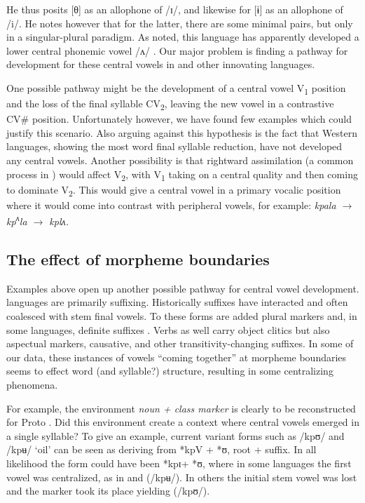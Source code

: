 \documentclass[output=paper,newtxmath,modfonts,nonflat,draft]{langsci/langscibook}
\begin{document}
He thus posits [θ] as an allophone of /ɪ/, and likewise for [ɨ] as an allophone of /i/.  He notes however that for the latter, there are some minimal pairs, but only in a singular-plural paradigm. As noted, this language has apparently developed a lower central phonemic vowel /ʌ/ \citep{Vahoua2011}. Our major problem is finding a pathway for development for these central vowels in  and other innovating languages. 

One possible pathway might be the development of a central vowel V\textsubscript{1} position and the loss of the final syllable CV\textsubscript{2}, leaving the new vowel in a contrastive CV\# position.  Unfortunately however, we have found few examples which could justify this scenario. Also arguing against this hypothesis is the fact that Western languages, showing the most word final syllable reduction, have not developed any central vowels.  Another possibility is that rightward assimilation (a common  process in ) would affect V\textsubscript{2}, with V\textsubscript{1} taking on a central quality and then coming to dominate V\textsubscript{2}. This would give a central vowel in a primary vocalic position where it would come into contrast with peripheral vowels, for example:  \textit{kpala $\rightarrow$  kp\textsuperscript{ʌ}}\textit{la $\rightarrow$ kplʌ.}

\subsection{The effect of morpheme boundaries}\label{sec:zogbo:4.3} 

Examples above open up another possible pathway for central vowel development.  languages are primarily suffixing.  Historically  suffixes have interacted and often coalesced with stem final vowels. To these forms are added plural markers and, in some languages, definite suffixes \citep{Marchese1979/1983,Zogbo2017}.  Verbs as well carry object clitics but also aspectual markers, causative, and other transitivity-changing suffixes. In some of our data, these instances of vowels “coming together” at morpheme boundaries seems to effect word (and syllable?) structure, resulting in some centralizing phenomena. 

For example, the environment \textit{noun + class marker} is clearly to be reconstructed for Proto .  Did this environment create a context where central vowels emerged in a single syllable?  To give an example, current variant forms such as /kpʊ/ and /kpʉ/ ‘oil’ can be seen as deriving from *kpV + *ʊ, root +  suffix. In all likelihood the form could have been *kpɪ+ *ʊ, where in some languages the first vowel was centralized, as in  and  (/kpʉ/). In others the initial stem vowel was lost and the  marker took its place yielding (/kpʊ/).
\end{document}
